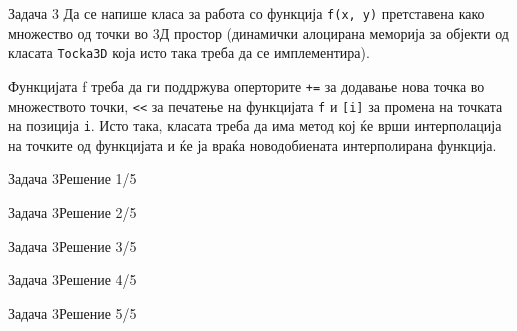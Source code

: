 \begin{frame}{Задача 3}
Да се напише класа за работа со функција \texttt{f(x, y)} претставена како множество од
точки во 3Д простор (динамички алоцирана меморија за објекти од класата \texttt{Tocka3D}
која исто така треба да се имплементира). 

Функцијата f треба да  ги поддржува оперторите \texttt{+=} за додавање нова точка во
множеството точки, \texttt{<<}  за печатење на функцијата \texttt{f} и \texttt{[i]}  за промена  на 
точката  на  позиција \texttt{i}. Исто така, класата треба  да  има  метод 
кој ќе врши интерполација на точките од функцијата и ќе ја враќа новодобиената  
интерполирана функција.

\end{frame}

\begin{frame}[fragile]{Задача 3}{Решение 1/5}

\end{frame}

\begin{frame}[fragile]{Задача 3}{Решение 2/5}

\end{frame}

\begin{frame}[fragile]{Задача 3}{Решение 3/5}

\end{frame}

\begin{frame}[fragile,shrink=10]{Задача 3}{Решение 4/5}

\end{frame}

\begin{frame}[fragile]{Задача 3}{Решение 5/5}

\end{frame}
